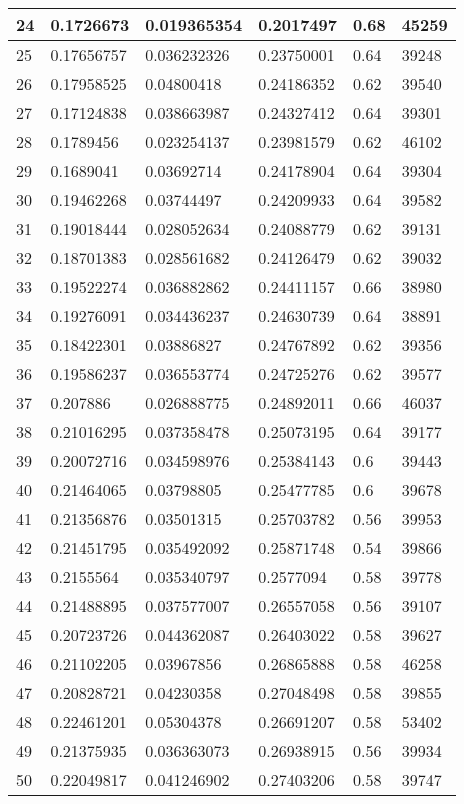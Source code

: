 \begin{longtable}{|l|l|l|l|l|l|}
24 & 0.1726673 & 0.019365354 & 0.2017497 & 0.68 & 45259 \\ \hline 
25 & 0.17656757 & 0.036232326 & 0.23750001 & 0.64 & 39248 \\ \hline 
26 & 0.17958525 & 0.04800418 & 0.24186352 & 0.62 & 39540 \\ \hline 
27 & 0.17124838 & 0.038663987 & 0.24327412 & 0.64 & 39301 \\ \hline 
28 & 0.1789456 & 0.023254137 & 0.23981579 & 0.62 & 46102 \\ \hline 
29 & 0.1689041 & 0.03692714 & 0.24178904 & 0.64 & 39304 \\ \hline 
30 & 0.19462268 & 0.03744497 & 0.24209933 & 0.64 & 39582 \\ \hline 
31 & 0.19018444 & 0.028052634 & 0.24088779 & 0.62 & 39131 \\ \hline 
32 & 0.18701383 & 0.028561682 & 0.24126479 & 0.62 & 39032 \\ \hline 
33 & 0.19522274 & 0.036882862 & 0.24411157 & 0.66 & 38980 \\ \hline 
34 & 0.19276091 & 0.034436237 & 0.24630739 & 0.64 & 38891 \\ \hline 
35 & 0.18422301 & 0.03886827 & 0.24767892 & 0.62 & 39356 \\ \hline 
36 & 0.19586237 & 0.036553774 & 0.24725276 & 0.62 & 39577 \\ \hline 
37 & 0.207886 & 0.026888775 & 0.24892011 & 0.66 & 46037 \\ \hline 
38 & 0.21016295 & 0.037358478 & 0.25073195 & 0.64 & 39177 \\ \hline 
39 & 0.20072716 & 0.034598976 & 0.25384143 & 0.6 & 39443 \\ \hline 
40 & 0.21464065 & 0.03798805 & 0.25477785 & 0.6 & 39678 \\ \hline 
41 & 0.21356876 & 0.03501315 & 0.25703782 & 0.56 & 39953 \\ \hline 
42 & 0.21451795 & 0.035492092 & 0.25871748 & 0.54 & 39866 \\ \hline 
43 & 0.2155564 & 0.035340797 & 0.2577094 & 0.58 & 39778 \\ \hline 
44 & 0.21488895 & 0.037577007 & 0.26557058 & 0.56 & 39107 \\ \hline 
45 & 0.20723726 & 0.044362087 & 0.26403022 & 0.58 & 39627 \\ \hline 
46 & 0.21102205 & 0.03967856 & 0.26865888 & 0.58 & 46258 \\ \hline 
47 & 0.20828721 & 0.04230358 & 0.27048498 & 0.58 & 39855 \\ \hline 
48 & 0.22461201 & 0.05304378 & 0.26691207 & 0.58 & 53402 \\ \hline 
49 & 0.21375935 & 0.036363073 & 0.26938915 & 0.56 & 39934 \\ \hline 
50 & 0.22049817 & 0.041246902 & 0.27403206 & 0.58 & 39747 \\ \hline 
\end{longtable}